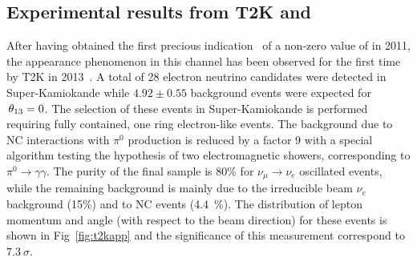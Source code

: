  
 
\subsection{Experimental results from T2K and \nova}


After having obtained the first precious indication~\cite{t2k2011} of a non-zero value of \thint in 2011, the \nue appearance phenomenon in this channel has been observed for the first time by T2K in 2013~\cite{Abe:2013hdq}. A total of 28 electron neutrino candidates were detected in Super-Kamiokande while $4.92\pm0.55$ background events were expected for $\textrm \,\theta_{13}=0$. The selection of these events in Super-Kamiokande is performed requiring fully contained, one ring electron-like events. The background due to NC interactions with $\pi^0$ production is reduced by a factor 9 with a special algorithm testing the hypothesis of two electromagnetic showers, corresponding to $\pi^0 \rightarrow \gamma \gamma$. The purity of the final sample is 80\% for $\nu_\mu \rightarrow \nu_e$ oscillated events, while the remaining background is mainly due to the irreducible beam $\nu_e$ background (15\%) and to NC events (4.4~\%). 
The distribution of lepton momentum and angle (with respect to the beam direction) for these events is shown in Fig~\ref{fig:t2kapp} and the significance of this measurement correspond to $7.3~\sigma$. 


